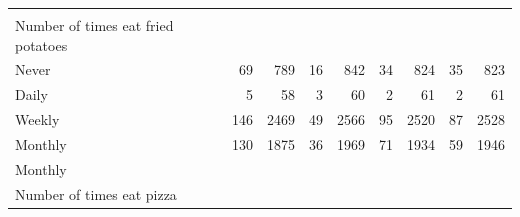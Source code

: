 \documentclass{article}
\begin{document}
\begin{table}[!h]
{\begin{tabular}{lllllllll}
			\multicolumn{1}{|r}{} &
			\multicolumn{1}{r}{} &
			\multicolumn{1}{r}{} &
			\multicolumn{1}{r}{} &
			\multicolumn{1}{r}{} &
			\multicolumn{1}{r}{} &
			\multicolumn{1}{r}{} &
			\multicolumn{1}{r}{} \\
			\multicolumn{1}{l}{\hspace{4em}Number of times eat fried potatoes} &
			\multicolumn{1}{|r}{} &
			\multicolumn{1}{r}{} &
			\multicolumn{1}{r}{} &
			\multicolumn{1}{r}{} &
			\multicolumn{1}{r}{} &
			\multicolumn{1}{r}{} &
			\multicolumn{1}{r}{} &
			\multicolumn{1}{r}{} \\
			\multicolumn{1}{l}{\hspace{5em}Never} &
			\multicolumn{1}{|r}{69} &
			\multicolumn{1}{r}{789} &
			\multicolumn{1}{r}{16} &
			\multicolumn{1}{r}{842} &
			\multicolumn{1}{r}{34} &
			\multicolumn{1}{r}{824} &
			\multicolumn{1}{r}{35} &
			\multicolumn{1}{r}{823} \\
			\multicolumn{1}{l}{\hspace{5em}Daily} &
			\multicolumn{1}{|r}{5} &
			\multicolumn{1}{r}{58} &
			\multicolumn{1}{r}{3} &
			\multicolumn{1}{r}{60} &
			\multicolumn{1}{r}{2} &
			\multicolumn{1}{r}{61} &
			\multicolumn{1}{r}{2} &
			\multicolumn{1}{r}{61} \\
			\multicolumn{1}{l}{\hspace{5em}Weekly} &
			\multicolumn{1}{|r}{146} &
			\multicolumn{1}{r}{2469} &
			\multicolumn{1}{r}{49} &
			\multicolumn{1}{r}{2566} &
			\multicolumn{1}{r}{95} &
			\multicolumn{1}{r}{2520} &
			\multicolumn{1}{r}{87} &
			\multicolumn{1}{r}{2528} \\
			\multicolumn{1}{l}{\hspace{5em}Monthly} &
			\multicolumn{1}{|r}{130} &
			\multicolumn{1}{r}{1875} &
			\multicolumn{1}{r}{36} &
			\multicolumn{1}{r}{1969} &
			\multicolumn{1}{r}{71} &
			\multicolumn{1}{r}{1934} &
			\multicolumn{1}{r}{59} &
			\multicolumn{1}{r}{1946} \\
			\multicolumn{1}{l}{\hspace{1em}Monthly} &
			\multicolumn{1}{|r}{} &
			\multicolumn{1}{r}{} &
			\multicolumn{1}{r}{} &
			\multicolumn{1}{r}{} &
			\multicolumn{1}{r}{} &
			\multicolumn{1}{r}{} &
			\multicolumn{1}{r}{} &
			\multicolumn{1}{r}{} \\
			\multicolumn{1}{l}{\hspace{2em}Number of times eat pizza} &
			\multicolumn{1}{|r}{} &
			\multicolumn{1}{r}{} &
			\multicolumn{1}{r}{} &
			\multicolumn{1}{r}{} &
			\multicolumn{1}{r}{} &
			\multicolumn{1}{r}{} &

\end{tabular}}
\end{table}
\end{document}
